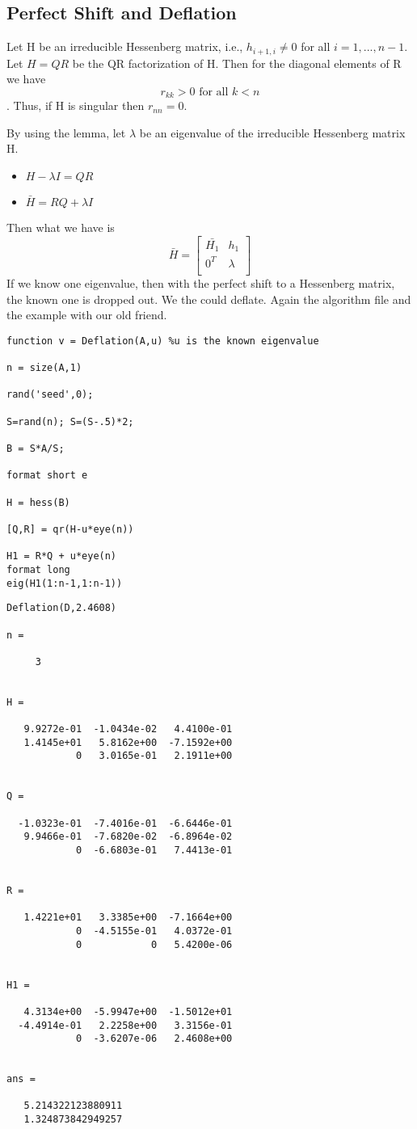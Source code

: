 \subsection{Perfect Shift and Deflation}
\begin{lemma}
Let H be an irreducible Hessenberg matrix, i.e., $h_{i+1,i} \neq 0$ for all $i = 1,...,n-1$. Let $H = QR$ be the QR factorization of H. Then for the diagonal elements of R we have \[r_{kk} > 0 \text{ for all } k<n\].
Thus, if H is singular then $r_{nn}=0$.
\end{lemma}
By using the lemma, let $\lambda$ be an eigenvalue of the irreducible Hessenberg matrix H.
\begin{itemize}
    \item $H-\lambda I = QR$
    \item $\bar{H} = RQ + \lambda I$
\end{itemize}
Then what we have is 
\begin{equation}
    \bar{H} = \begin{bmatrix}
        \bar{H_1} & h_1 \\
        0^T & \lambda \\
    \end{bmatrix}
\end{equation}
If we know one eigenvalue, then with the perfect shift to a Hessenberg matrix, the known one is dropped out. We the could deflate.
Again the algorithm file and the example with our old friend.
\begin{verbatim}
function v = Deflation(A,u) %u is the known eigenvalue

n = size(A,1)

rand('seed',0);

S=rand(n); S=(S-.5)*2;

B = S*A/S;

format short e

H = hess(B)

[Q,R] = qr(H-u*eye(n))

H1 = R*Q + u*eye(n)
format long
eig(H1(1:n-1,1:n-1))
\end{verbatim}
\begin{verbatim}
Deflation(D,2.4608)

n =

     3


H =

   9.9272e-01  -1.0434e-02   4.4100e-01
   1.4145e+01   5.8162e+00  -7.1592e+00
            0   3.0165e-01   2.1911e+00


Q =

  -1.0323e-01  -7.4016e-01  -6.6446e-01
   9.9466e-01  -7.6820e-02  -6.8964e-02
            0  -6.6803e-01   7.4413e-01


R =

   1.4221e+01   3.3385e+00  -7.1664e+00
            0  -4.5155e-01   4.0372e-01
            0            0   5.4200e-06


H1 =

   4.3134e+00  -5.9947e+00  -1.5012e+01
  -4.4914e-01   2.2258e+00   3.3156e-01
            0  -3.6207e-06   2.4608e+00


ans =

   5.214322123880911
   1.324873842949257
\end{verbatim}

